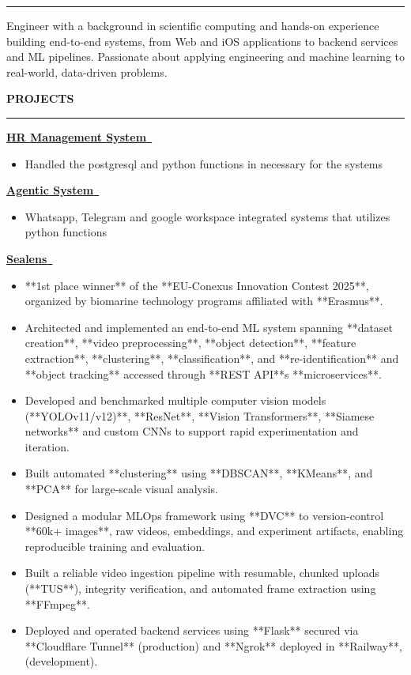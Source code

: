 \documentclass[11pt,letterpaper]{article}
\newenvironment{rSection}[1]{%
  \sectionskip
  \MakeUppercase{\bf#1}
  \sectionlineskip
  \hrule
  \begin{list}{}{\setlength{\leftmargin}{1.5em}}
  \item[]
}{%
  \end{list}
}
\def\sectionlineskip{\medskip}
\def\sectionskip{\medskip}
\begin{document}
\begin{rSection}{}

Engineer with a background in scientific computing and hands-on experience building end-to-end systems, from Web and iOS applications to backend services and ML pipelines. Passionate about applying engineering and machine learning to real-world, data-driven problems.

\end{rSection}

\begin{rSection}{Projects}



\href{https://Radikari Ownwed}{\textbf{HR Management System}~\faLink}

\begin{itemize}
\itemsep -0.45em
\item Handled the postgresql and python functions in necessary for the systems
\end{itemize}


\href{https://Radikari Owned}{\textbf{Agentic System}~\faLink}

\begin{itemize}
\itemsep -0.45em
\item Whatsapp, Telegram and google workspace integrated systems that utilizes python functions
\end{itemize}


\href{https://testflight.apple.com/join/Gq3z5Pus}{\textbf{Sealens}~\faLink}

\begin{itemize}
\itemsep -0.45em
\item **1st place winner** of the **EU-Conexus Innovation Contest 2025**, organized by biomarine technology programs affiliated with **Erasmus**.
\item Architected and implemented an end-to-end ML system spanning **dataset creation**, **video preprocessing**, **object detection**, **feature extraction**, **clustering**, **classification**, and **re-identification** and **object tracking** accessed through **REST API**s **microservices**.
\item Developed and benchmarked multiple computer vision models (**YOLOv11/v12)**, **ResNet**, **Vision Transformers**, **Siamese networks** and custom CNNs to support rapid experimentation and iteration.
\item Built automated **clustering** using **DBSCAN**, **KMeans**, and **PCA** for large-scale visual analysis.
\item Designed a modular MLOps framework using **DVC** to version-control **60k+ images**, raw videos, embeddings, and experiment artifacts, enabling reproducible training and evaluation.
\item Built a reliable video ingestion pipeline with resumable, chunked uploads (**TUS**), integrity verification, and automated frame extraction using **FFmpeg**.
\item Deployed and operated backend services using **Flask** secured via **Cloudflare Tunnel** (production) and **Ngrok** deployed in **Railway**,  (development).
\end{itemize}



\end{rSection}
\end{document}
